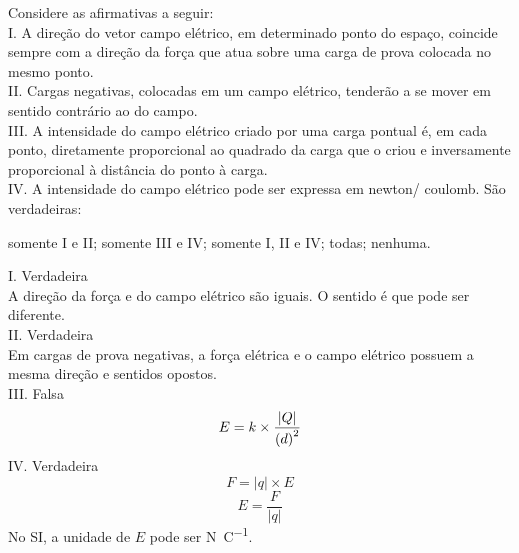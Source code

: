 
\question [\questaopt] Considere as afirmativas a seguir:\\
I. A direção do vetor campo elétrico, em determinado ponto do 
espaço, coincide sempre com a direção da força que atua sobre uma
carga de prova colocada no mesmo ponto.\\
II. Cargas negativas, colocadas em um campo elétrico, tenderão a se
mover em sentido contrário ao do campo.\\
III. A intensidade do campo elétrico criado por uma carga pontual é, em
cada ponto, diretamente proporcional ao quadrado da carga que o
criou e inversamente proporcional à distância do ponto à carga.\\
IV. A intensidade do campo elétrico pode ser expressa em newton/
coulomb.
São verdadeiras:
				

		\begin{EnvUplevel}
			\begin{choices}
			
			\choice somente I e II;  
			\choice somente III e IV;
			\correctchoice somente I, II e IV;
			\choice todas;
			\choice nenhuma.
				
			\end{choices}
		\end{EnvUplevel}

		
		\begin{EnvUplevel}
		\begin{solution}[2cm]
		{\footnotesize
	I. Verdadeira\\
	A direção da força e do campo elétrico são iguais. O sentido é que
	pode ser diferente.\\
	II. Verdadeira\\
	Em cargas de prova negativas, a força elétrica e o campo elétrico
	possuem a mesma direção e sentidos opostos.\\
	III. Falsa\\
	$$
	E=k\times\frac{\left| Q  \right|}{\left( d \right)^{2}} \\
	$$
	IV. Verdadeira
	$$
	F = \left|q \right| \times E 
	$$ $$
	E = \frac{F}{\left|q \right|}
	$$
	No SI, a unidade de $ E $ pode ser \si[per-mode=symbol-or-fraction]{\newton\per\coulomb}.
		}
		
		\end{solution}
		\end{EnvUplevel}
